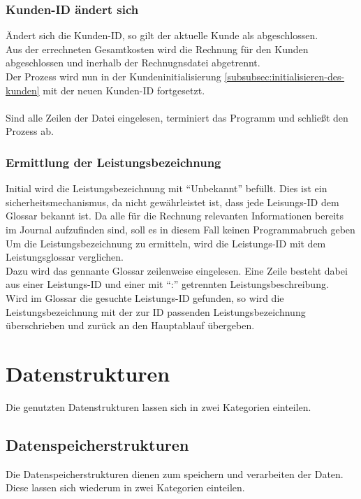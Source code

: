 \subsubsection{Kunden-ID ändert sich}\label{subsubsec:kunden-id-aendert-sich}
Ändert sich die Kunden-ID, so gilt der aktuelle Kunde als abgeschlossen.\\
Aus der errechneten Gesamtkosten wird die Rechnung für den Kunden abgeschlossen und inerhalb der Rechnugnsdatei abgetrennt.\\
Der Prozess wird nun in der Kundeninitialisierung \ref{subsubsec:initialisieren-des-kunden} mit der neuen Kunden-ID fortgesetzt.\\
\\

Sind alle Zeilen der Datei eingelesen, terminiert das Programm und schließt den Prozess ab.\\

\subsubsection{Ermittlung der Leistungsbezeichnung}\label{subsubsec:ermittlung-der-leistungsbezeichnung}
Initial wird die Leistungsbezeichnung mit \enquote{Unbekannt} befüllt. Dies ist ein sicherheitsmechanismus, da nicht gewährleistet ist, dass jede Leisungs-ID dem Glossar bekannt ist. Da alle für die Rechnung relevanten Informationen bereits im Journal aufzufinden sind, soll es in diesem Fall keinen Programmabruch geben\\
Um die Leistungsbezeichnung zu ermitteln, wird die Leistungs-ID mit dem Leistungsglossar verglichen.\\
Dazu wird das gennante Glossar zeilenweise eingelesen. Eine Zeile besteht dabei aus einer Leistungs-ID und einer mit \enquote{:} getrennten Leistungsbeschreibung.\\
Wird im Glossar die gesuchte Leistungs-ID gefunden, so wird die Leistungsbezeichnung mit der zur ID passenden Leistungsbezeichnung überschrieben und zurück an den Hauptablauf übergeben.\\

\section{Datenstrukturen}\label{subsec:datenstrukt}
Die genutzten Datenstrukturen lassen sich in zwei Kategorien einteilen.\\

\subsection{Datenspeicherstrukturen}\label{subsubsec:dynamische-datenstrukturen}
Die Datenspeicherstrukturen dienen zum speichern und verarbeiten der Daten.\\
Diese lassen sich wiederum in zwei Kategorien einteilen.\\

